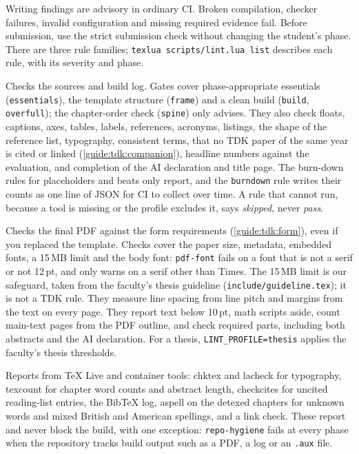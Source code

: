 Writing findings are advisory in ordinary CI. Broken compilation, checker failures, invalid configuration and missing required evidence fail. Before submission, use the strict submission check without changing the student's phase. There are three rule families; \texttt{texlua scripts/lint.lua list} describes each rule, with its severity and phase.
\begin{description}[noitemsep]
  \item[source] Checks the sources and build log. Gates cover phase-appropriate essentials (\texttt{essentials}), the template structure (\texttt{frame}) and a clean build (\texttt{build}, \texttt{overfull}); the chapter-order check (\texttt{spine}) only advises. They also check floats, captions, axes, tables, labels, references, acronyms, listings, the shape of the reference list, typography, consistent terms, that no TDK paper of the same year is cited or linked (\cref{guide:tdk:companion}), headline numbers against the evaluation, and completion of the AI declaration and title page. The burn-down rules for placeholders and beats only report, and the \texttt{burndown} rule writes their counts as one line of JSON for CI to collect over time. A rule that cannot run, because a tool is missing or the profile excludes it, says \emph{skipped}, never \emph{pass}.
  \item[pdf] Checks the final PDF against the form requirements (\cref{guide:tdk:form}), even if you replaced the template. Checks cover the paper size, metadata, embedded fonts, a 15\,MB limit and the body font: \texttt{pdf-font} fails on a font that is not a serif or not 12\,pt, and only warns on a serif other than Times. The 15\,MB limit is our safeguard, taken from the faculty's thesis guideline (\texttt{include/guideline.tex}); it is not a TDK rule. They measure line spacing from line pitch and margins from the text on every page. They report text below 10\,pt, math scripts aside, count main-text pages from the PDF outline, and check required parts, including both abstracts and the AI declaration. For a thesis, \texttt{LINT\_PROFILE=thesis} applies the faculty's thesis thresholds.
  \item[tools] Reports from TeX Live and container tools: chktex and lacheck for typography, texcount for chapter word counts and abstract length, checkcites for uncited reading-list entries, the BibTeX log, aspell on the detexed chapters for unknown words and mixed British and American spellings, and a link check. These report and never block the build, with one exception: \texttt{repo-hygiene} fails at every phase when the repository tracks build output such as a PDF, a log or an \texttt{.aux} file.
\end{description}
